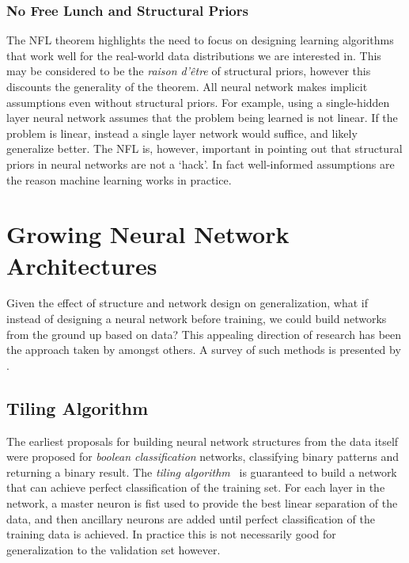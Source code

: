 \documentclass[thesis]{subfiles}
\begin{document}
\subsubsection{No Free Lunch and Structural Priors}
The NFL theorem highlights the need to focus on designing learning algorithms that work well for the real-world data distributions we are interested in. This may be considered to be the \emph{raison d'\^{e}tre} of structural priors, however this discounts the generality of the theorem. All neural network makes implicit assumptions even without structural priors. For example, using a single-hidden  layer neural network assumes that the problem being learned is not linear. If the problem is linear, instead a single layer network would suffice, and likely generalize better. The NFL is, however, important in pointing out that structural priors in neural networks are not a `hack'. In fact well-informed assumptions are the reason machine learning works in practice.

\section{Growing Neural Network Architectures}
	Given the effect of structure and network design on generalization, what if instead of designing a neural network before training, we could build networks from the ground up based on data? This appealing direction of research has been the approach taken by \citet{mezard1989learning,Fahlman1989,frean1990upstart,MacKay91,mackay1992practical,hypernetworks} amongst others. A survey of such methods is presented by \citet{parekh2000constructive}.
	
	\subsection{Tiling Algorithm}
	The earliest proposals for building neural network structures from the data itself were proposed for \emph{boolean classification} networks, \ie classifying binary patterns and returning a binary result. The \emph{tiling algorithm}~\citep{mezard1989learning} is guaranteed to build a network that can achieve perfect classification of the training set. For each layer in the network, a master neuron is fist used to provide the best linear separation of the data, and then ancillary neurons are added until perfect classification of the training data is achieved. In practice this is not necessarily good for generalization to the validation set however. 
	
\end{document}
